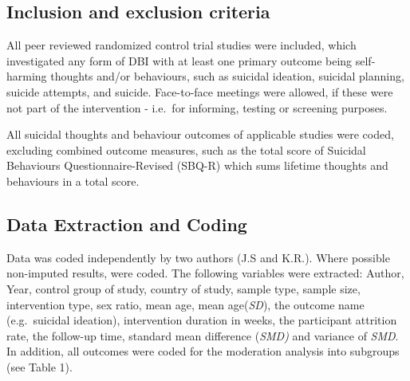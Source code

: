\documentclass[
  english,
  man]{apa6}
\begin{document}
\hypertarget{inclusion-and-exclusion-criteria}{%
\subsection{Inclusion and exclusion criteria}\label{inclusion-and-exclusion-criteria}}

All peer reviewed randomized control trial studies were included, which investigated any form of DBI with at least one primary outcome being self-harming thoughts and/or behaviours, such as suicidal ideation, suicidal planning, suicide attempts, and suicide. Face-to-face meetings were allowed, if these were not part of the intervention - i.e.~for informing, testing or screening purposes.

All suicidal thoughts and behaviour outcomes of applicable studies were coded, excluding combined outcome measures, such as the total score of
Suicidal Behaviours Questionnaire-Revised (SBQ-R) which sums lifetime thoughts and behaviours in a total score.

\hypertarget{data-extraction-and-coding}{%
\subsection{Data Extraction and Coding}\label{data-extraction-and-coding}}

Data was coded independently by two authors (J.S and K.R.). Where possible non-imputed results, were coded. The following variables were extracted: Author, Year, control group of study, country of study, sample type, sample size, intervention type, sex ratio, mean age, mean age(\emph{SD}), the outcome name (e.g.~suicidal ideation), intervention duration in weeks, the participant attrition rate, the follow-up time, standard mean difference (\emph{SMD)} and variance of \emph{SMD}. In addition, all outcomes were coded for the moderation analysis into subgroups (see Table 1).
\end{document}
